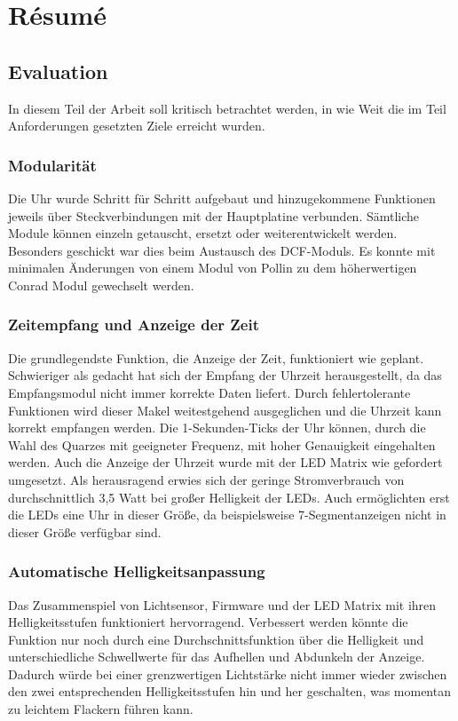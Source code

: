 \section{Résumé}
\subsection{Evaluation}
In diesem Teil der Arbeit soll kritisch betrachtet werden, in wie Weit die im
Teil Anforderungen gesetzten Ziele erreicht wurden.
\subsubsection{Modularität}
Die Uhr wurde Schritt für Schritt aufgebaut und hinzugekommene Funktionen
jeweils über Steckverbindungen mit der Hauptplatine verbunden. Sämtliche Module können
einzeln getauscht, ersetzt oder weiterentwickelt werden. Besonders geschickt war
dies beim Austausch des DCF-Moduls. Es konnte mit minimalen Änderungen von einem
Modul von Pollin zu dem höherwertigen Conrad Modul gewechselt werden. 
\subsubsection{Zeitempfang und Anzeige der Zeit}
Die grundlegendste Funktion, die Anzeige der Zeit, funktioniert wie geplant. Schwieriger als
gedacht hat sich der Empfang der Uhrzeit herausgestellt, da das
Empfangsmodul nicht immer korrekte Daten liefert. Durch fehlertolerante
Funktionen wird dieser Makel weitestgehend ausgeglichen und die Uhrzeit kann
korrekt empfangen werden. Die 1-Sekunden-Ticks der Uhr können, durch die Wahl
des Quarzes mit geeigneter Frequenz, mit hoher Genauigkeit eingehalten werden.
Auch die Anzeige der Uhrzeit wurde mit der LED Matrix wie gefordert umgesetzt.
Als herausragend erwies sich der geringe Stromverbrauch von durchschnittlich 3,5 Watt bei großer Helligkeit
der LEDs. Auch ermöglichten erst die LEDs eine Uhr in dieser Größe, da beispielsweise
7-Segmentanzeigen nicht in dieser Größe verfügbar sind.
%
\subsubsection{Automatische Helligkeitsanpassung}
Das Zusammenspiel von Lichtsensor, Firmware und der LED Matrix mit ihren
Helligkeitsstufen funktioniert hervorragend. Verbessert werden könnte die
Funktion nur noch durch eine Durchschnittsfunktion über die Helligkeit und
unterschiedliche Schwellwerte für das Aufhellen und Abdunkeln der
Anzeige. Dadurch würde bei einer grenzwertigen Lichtstärke
nicht immer wieder zwischen den zwei entsprechenden Helligkeitsstufen hin und
her geschalten, was momentan zu leichtem Flackern führen kann.
%
